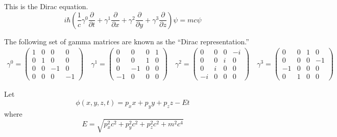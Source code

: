 \documentclass[12pt]{article}
\begin{document}
\noindent
This is the Dirac equation.
\begin{equation*}
i\hbar\left(\frac{1}{c}
\gamma^0\frac{\partial}{\partial t}+
\gamma^1\frac{\partial}{\partial x}+
\gamma^2\frac{\partial}{\partial y}+
\gamma^3\frac{\partial}{\partial z}
\right)\psi
=mc\psi
\end{equation*}

\noindent
The following set of gamma matrices are known as the ``Dirac representation.''
{\small
\begin{gather*}
\gamma^0=\begin{pmatrix}1&0&0&0\\0&1&0&0\\0&0&-1&0\\0&0&0&-1\end{pmatrix}\quad
\gamma^1=\begin{pmatrix}0&0&0&1\\0&0&1&0\\0&-1&0&0\\-1&0&0&0\end{pmatrix}\quad
\gamma^2=\begin{pmatrix}0&0&0&-i\\0&0&i&0\\0&i&0&0\\-i&0&0&0\end{pmatrix}\quad
\gamma^3=\begin{pmatrix}0&0&1&0\\0&0&0&-1\\-1&0&0&0\\0&1&0&0\end{pmatrix}
\end{gather*}
}

\noindent
Let
\begin{equation*}
\phi(x,y,z,t)=p_xx+p_yy+p_zz-Et
\end{equation*}
where
\begin{equation*}
E=\sqrt{p_x^2c^2+p_y^2c^2+p_z^2c^2+m^2c^4}
\end{equation*}
\end{document}
